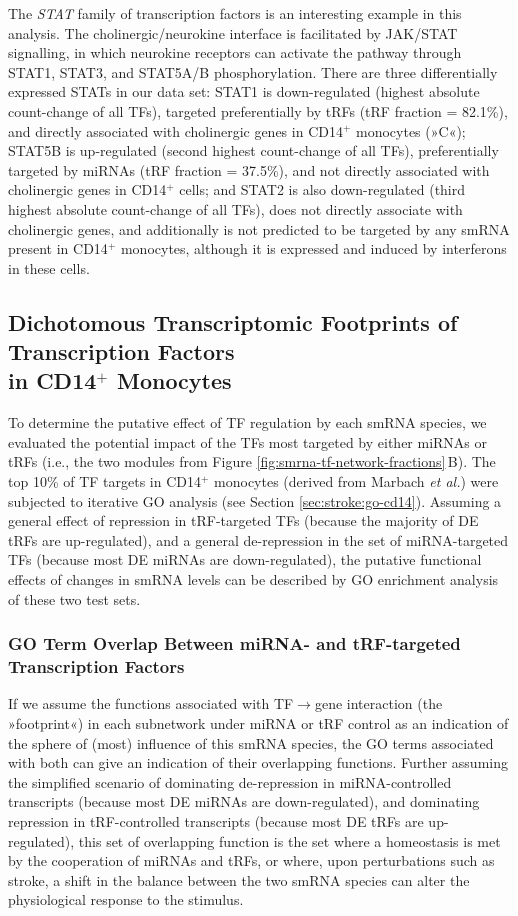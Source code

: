 The \emph{STAT} family of transcription factors is an interesting example in this analysis. The cholinergic/neurokine interface is facilitated by JAK/STAT signalling, in which neurokine receptors can activate the pathway through STAT1, STAT3, and STAT5A/B phosphorylation.\cite{Lobentanzer2019a} There are three differentially expressed STATs in our data set: STAT1 is down-regulated (highest absolute count-change of all TFs), targeted preferentially by tRFs (tRF fraction = 82.1\%), and directly associated with cholinergic genes in CD14$^+$ monocytes (»C«); STAT5B is up-regulated (second highest count-change of all TFs), preferentially targeted by miRNAs (tRF fraction = 37.5\%), and not directly associated with cholinergic genes in CD14$^+$ cells; and STAT2 is also down-regulated (third highest absolute count-change of all TFs), does not directly associate with cholinergic genes, and additionally is not predicted to be targeted by any smRNA present in CD14$^+$ monocytes, although it is expressed and induced by interferons in these cells.\cite{Lehtonen1997} 

\subsection{Dichotomous Transcriptomic Footprints of Transcription Factors\\ in CD14$^+$ Monocytes}
To determine the putative effect of TF regulation by each smRNA species, we evaluated the potential impact of the TFs most targeted by either miRNAs or tRFs (i.e., the two modules from Figure \ref{fig:smrna-tf-network-fractions}\,B). The top 10\% of TF targets in CD14$^+$ monocytes (derived from Marbach \emph{et al.}\cite{Marbach2016}) were subjected to iterative GO analysis (see Section \ref{sec:stroke:go-cd14}). Assuming a general effect of repression in tRF-targeted TFs (because the majority of DE tRFs are up-regulated), and a general de-repression in the set of miRNA-targeted TFs (because most DE miRNAs are down-regulated), the putative functional effects of changes in smRNA levels can be described by GO enrichment analysis of these two test sets.

\subsubsection{GO Term Overlap Between miRNA- and tRF-targeted Transcription Factors}
If we assume the functions associated with TF$\to$gene interaction (the »footprint«) in each subnetwork under miRNA or tRF control as an indication of the sphere of (most) influence of this smRNA species, the GO terms associated with both can give an indication of their overlapping functions. Further assuming the simplified scenario of dominating de-repression in miRNA-controlled transcripts (because most DE miRNAs are down-regulated), and dominating repression in tRF-controlled transcripts (because most DE tRFs are up-regulated), this set of overlapping function is the set where a homeostasis is met by the cooperation of miRNAs and tRFs, or where, upon perturbations such as stroke, a shift in the balance between the two smRNA species can alter the physiological response to the stimulus.


